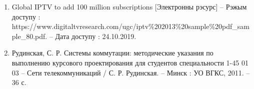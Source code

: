 \begin{enumerate}[{label=\arabic{*}}]
          [Электронны рэсурс] --
          http://mediasat.info/2016/05/10/iptv-130-mln-subscribers/
          Дата доступу : 24.10.2019.
          \label{stat: IPTV-world-2016}
    \item Global IPTV to add 100 million subscriptions
          [Электронны рэсурс] --
          Рэжым доступу : https://www.digitaltvresearch.com/ugc/iptv\%202013\%20sample\%20pdf\_sample\_80.pdf. --
          Дата доступу : 24.10.2019.
          \label{stat: IPTV-world-2018}
    \item Рудинская, С. Р. Системы коммутации:
          методические указания по выполнению курсового проектирования
          для студентов специальности 1-45 01 03 --
          Сети телекоммуникаций / С. Р. Рудинская. -- Минск : УО ВГКС,
          2011. -- 36 с.
          \label{book:Methodical Book}
\end{enumerate}
